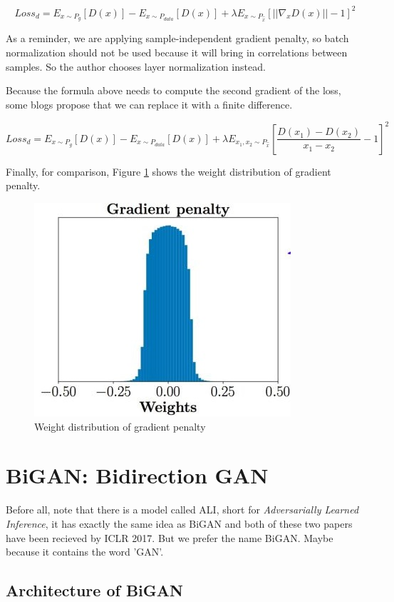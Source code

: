 \documentclass{article} %
\begin{document}
\begin{equation}
    Loss_d = E_{x \sim P_g}[D(x)]-E_{x \sim P_{data}}[D(x)]+\lambda E_{x \sim P_{\hat{x}}}[||\nabla_x D(x)|| - 1]^2
\end{equation}

As a reminder, we are applying sample-independent gradient penalty, so batch normalization should not be used because it will bring in correlations between samples. So the author chooses layer normalization instead.

Because the formula above needs to compute the second gradient of the loss, some blogs propose that we can replace it with a finite difference.

\begin{equation}
    Loss_d = E_{x \sim P_g}[D(x)]-E_{x \sim P_{data}}[D(x)]+\lambda E_{x_1,x_2 \sim P_{\hat{x}}}[\frac{D(x_1)-D(x_2)}{x_1-x_2} - 1]^2
\end{equation}

Finally, for comparison, Figure \ref{fig:gradient_penalty} shows the weight distribution of gradient penalty.

\begin{figure}[h]
	\centering
	\includegraphics[width=0.45\linewidth]{figures/gradient_penalty.jpg}
	\caption{Weight distribution of gradient penalty}
	\label{fig:gradient_penalty}
\end{figure}

\section{BiGAN: Bidirection GAN}

Before all, note that there is a model called ALI, short for \emph{Adversarially Learned Inference}, it has exactly the same idea as BiGAN and both of these two papers have been recieved by ICLR 2017. But we prefer the name BiGAN. Maybe because it contains the word 'GAN'.

\subsection{Architecture of BiGAN}
\end{document}
